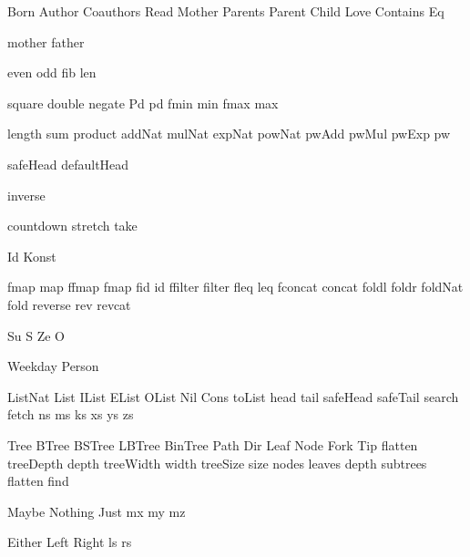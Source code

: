 
\DefRel Born
\DefRel Author
\DefRel Coauthors
\DefRel Read
\DefRel Mother
\DefRel Parents
\DefRel Parent
\DefRel Child
\DefRel Love
\DefRel Contains
\DefRel Eq

\DefFun mother
\DefFun father

\DefFun even
\DefFun odd
\DefFun fib
\DefFun len

\DefFpf square
\DefFpf double
\DefFpf negate
\DefFPF Pd pd
\DefFPF fmin   min
\DefFPF fmax   max

\DefFpf length
\DefFpf sum
\DefFpf product
\DefFpf addNat
\DefFpf mulNat
\DefFpf expNat
\DefFpf powNat
\DefFpf pwAdd
\DefFpf pwMul
\DefFpf pwExp
\DefFpf pw

\DefFpf safeHead
\DefFpf defaultHead

\DefFpf inverse

\DefFpf countdown
\DefFpf stretch
\DefFpf take

\DefType Id
\DefType Konst

\DefFPF fmap     map
\DefFPF ffmap    fmap
\DefFPF fid      id
\DefFPF ffilter  filter
\DefFPF fleq     leq
\DefFPF fconcat  concat
\DefFpf foldl
\DefFpf foldr
\DefFpf foldNat
\DefFpf fold
\DefFpf reverse
\DefFpf rev
\DefFpf revcat

\DefCONS Su S
\DefCONS Ze O

\DefType Weekday
\DefType Person

\DefType ListNat
\DefType List
\DefType IList
\DefType EList
\DefType OList
\DefCons Nil
\DefCons Cons
\DefFpf  toList
\DefFpf  head
\DefFpf  tail
\DefFpf  safeHead
\DefFpf  safeTail
\DefFpf  search
\DefFpf  fetch
\DefVar  ns
\DefVar  ms
\DefVar  ks
\DefVar  xs
\DefVar  ys
\DefVar  zs

\DefType Tree
\DefType BTree
\DefType BSTree
\DefType LBTree
\DefType BinTree
\DefType Path
\DefType Dir
\DefCons Leaf
\DefCons Node
\DefCons Fork
\DefCons Tip
\DefFpf  flatten
\DefFPF  treeDepth  depth
\DefFPF  treeWidth  width
\DefFPF  treeSize   size
\DefFpf  nodes
\DefFpf  leaves
\DefFpf  depth
\DefFpf  subtrees
\DefFpf  flatten
\DefFpf  find


\DefType Maybe
\DefCons Nothing
\DefCons Just
\DefVar  mx
\DefVar  my
\DefVar  mz

\DefType Either
\DefCons Left
\DefCons Right
\DefVar  ls
\DefVar  rs

\def\bla{\mathrm{bla}}
\def\blu{\mathrm{blu}}

\def\persons{{\cal P}}
\let\pers=\persons

\def\euclid{\algorithmstylize{Euclid}}%

\def\Smile{\rel{\woohoo}}
\def\Frown{\rel{\boohoo}}

\def\oddAs#1{A_{[#1]}}

